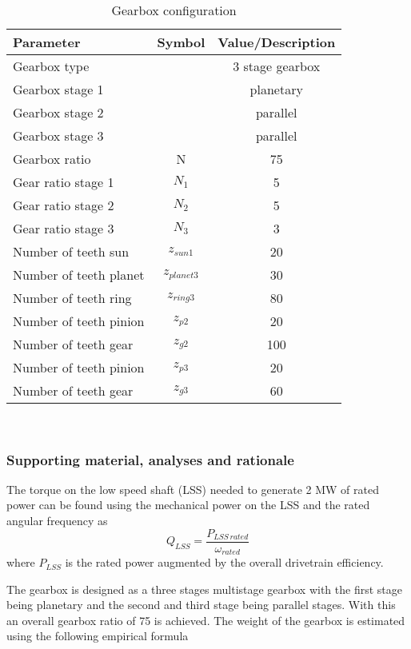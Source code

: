 \begin{table}[h]
\centering
\caption{Gearbox configuration}
\label{tab:gearbox_config}
\begin{tabular}{ |l|c|c| } 
\hline
\textbf{Parameter} & \textbf{Symbol} & \textbf{Value/Description}\\ 
\hline
Gearbox type & & 3 stage gearbox\\
Gearbox stage 1 & & planetary\\
Gearbox stage 2 & & parallel\\
Gearbox stage 3 & & parallel\\
Gearbox ratio & N & 75 \\
Gear ratio stage 1 & $N_1$ & 5\\
Gear ratio stage 2 & $N_2$ & 5\\
Gear ratio stage 3 & $N_3$ & 3\\
Number of teeth sun& $z_{sun1}$ & 20\\
Number of teeth planet& $z_{planet3}$ & 30\\
Number of teeth ring& $z_{ring3}$ & 80\\
Number of teeth pinion& $z_{p2}$ & 20\\
Number of teeth gear& $z_{g2}$ & 100\\
Number of teeth pinion& $z_{p3}$ & 20\\
Number of teeth gear& $z_{g3}$ & 60\\
\hline
\end{tabular} \\
\end{table}

\subsubsection{Supporting material, analyses and rationale}

The torque on the low speed shaft (LSS) needed to generate 2 MW of rated power can be found using the mechanical power on the LSS and the rated angular frequency as
\begin{equation}
    Q_{LSS} = \dfrac{P_{LSS\, rated}}{\omega_{rated}}
    \label{eq:Q_LSS}
\end{equation}
where $P_{LSS}$ is the rated power augmented by the overall drivetrain efficiency. 

The gearbox is designed as a three stages multistage gearbox with the first stage being planetary and the second and third stage being parallel stages. With this an overall gearbox ratio of 75 is achieved. 
The weight of the gearbox is estimated using the following empirical formula

